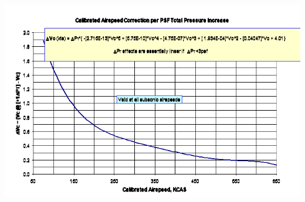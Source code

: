 \documentclass[
]{book}
\begin{document}
\includegraphics[width=8.6875in,height=5.73819in]{media/04/image55.png}
\end{document}
